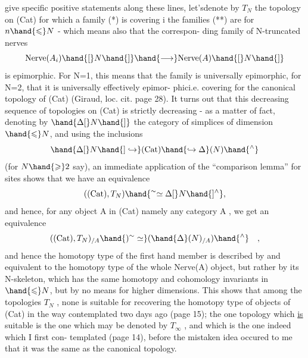 give specific positive statements along these lines, let'sdenote
by $T_N$ the topology on (Cat) for which a family (*) is covering i
the families (**) are for $n\hand{\leqslant} N$ - which means also that the correspon-%
ding family of N-truncated nerves
\[ \mathrm{Nerve}(A_i)\hand{[}N\hand{]} \hand{\longrightarrow} \mathrm{Nerve}(A)\hand{[}N\hand{]} \]
is epimorphic. For N=1, this means that the family is universally
epimorphic, for N=2, that it is universally effectively epimor-%
phici.e. covering for the canonical topology of (Cat) (Giraud, loc.
cit. page 28). It turns out that this decreasing sequence of topologies
on (Cat) is strictly decreasing - as a matter of fact, denoting by
$\hand{\Delta[}N\hand{]}$ the category of simplices of dimension $\hand{\leqslant} N$, and using the
inclusions
\[ \hand{\Delta[}N\hand{]\hookrightarrow}(\mathrm{Cat})\hand{\hookrightarrow\Delta}(N)\hand{^{\wedge}} \]
(for $N\hand{\geqslant}2$ say), an immediate application of the ``comparison lemma'' for
sites shows that we have an equivalence
\[ ((\mathrm{Cat}),T_N)\hand{^{\sim}\simeq\Delta[}N\hand{]^{\wedge}}, \]
and hence, for any object A in (Cat) namely any category A , we get
an equivalence
\[ ((\mathrm{Cat}),T_N)_{/A}\hand{)^{\sim}\simeq}(\hand{\Delta}(N)_{/A})\hand{^{\wedge}} \quad , \]
and hence the homotopy type of the first hand member is described by and
equivalent to the homotopy type of the whole Nerve(A) object, but
rather by its N-skeleton, which has the same homotopy and cohomology
invariants in  $\hand{\leqslant} N$, but by no means for higher dimensions. This
shows that among the topologies $T_N$ , none is suitable for recovering
the homotopy type of objects of (Cat) in the way contemplated two days
ago (page 15);  the one topology which \uline{is} suitable is the one which
may be denoted by $T_{\infty}$ , and which is the one indeed which I first con-%
templated (page 14), before the mistaken idea occured to me that it was
the same as the canonical topology.

